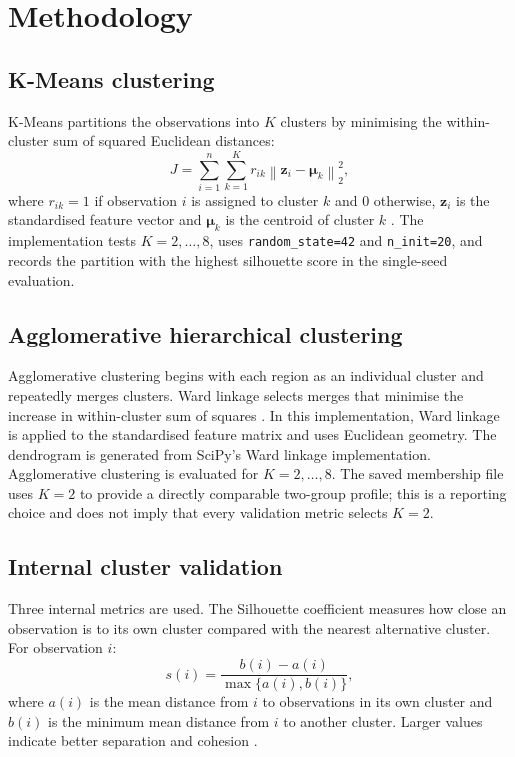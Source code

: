 \documentclass[11pt,a4paper]{article}
\begin{document}
\section{Methodology}
\subsection{K-Means clustering}
K-Means partitions the observations into $K$ clusters by minimising the within-cluster sum of squared Euclidean distances:
\begin{equation}
J=\sum_{i=1}^{n}\sum_{k=1}^{K} r_{ik}\left\|\mathbf{z}_i-\boldsymbol{\mu}_k\right\|_2^2,
\label{eq:kmeans}
\end{equation}
where $r_{ik}=1$ if observation $i$ is assigned to cluster $k$ and 0 otherwise, $\mathbf{z}_i$ is the standardised feature vector and $\boldsymbol{\mu}_k$ is the centroid of cluster $k$ \cite{macqueen1967}. The implementation tests $K=2,\ldots,8$, uses \texttt{random\_state=42} and \texttt{n\_init=20}, and records the partition with the highest silhouette score in the single-seed evaluation.

\subsection{Agglomerative hierarchical clustering}
Agglomerative clustering begins with each region as an individual cluster and repeatedly merges clusters. Ward linkage selects merges that minimise the increase in within-cluster sum of squares \cite{ward1963}. In this implementation, Ward linkage is applied to the standardised feature matrix and uses Euclidean geometry. The dendrogram is generated from SciPy's Ward linkage implementation. Agglomerative clustering is evaluated for $K=2,\ldots,8$. The saved membership file uses $K=2$ to provide a directly comparable two-group profile; this is a reporting choice and does not imply that every validation metric selects $K=2$.

\subsection{Internal cluster validation}
Three internal metrics are used. The Silhouette coefficient measures how close an observation is to its own cluster compared with the nearest alternative cluster. For observation $i$:
\begin{equation}
s(i)=\frac{b(i)-a(i)}{\max\{a(i),b(i)\}},
\label{eq:sil}
\end{equation}
where $a(i)$ is the mean distance from $i$ to observations in its own cluster and $b(i)$ is the minimum mean distance from $i$ to another cluster. Larger values indicate better separation and cohesion \cite{rousseeuw1987}.
\end{document}
